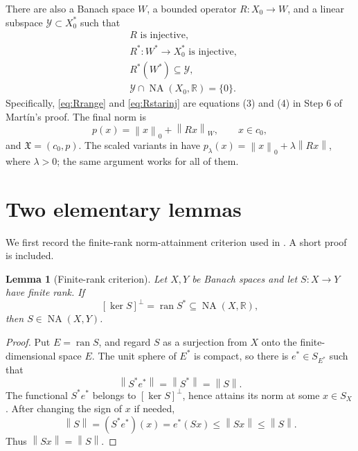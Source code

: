 \documentclass[11pt]{article}
\newtheorem{lemma}[theorem]{Lemma}
\theoremstyle{definition}
\newcommand{\NA}{\operatorname{NA}}
\newcommand{\ran}{\operatorname{ran}}
\newcommand{\R}{\mathbb R}
\newcommand{\X}{\mathfrak X}
\newcommand{\Xzero}{X_0}
\newcommand{\Yop}{\mathscr Y}
\newcommand{\norm}[1]{\left\lVert #1\right\rVert}
\begin{document}
There are also a Banach space \(W\), a bounded operator
\(R:\Xzero\to W\), and a linear subspace \(\Yop\subset \Xzero^*\) such that
\begin{align}
       &R \text{ is injective},                                      \label{eq:Rinj}\\
       &R^*:W^*\longrightarrow \Xzero^* \text{ is injective},         \label{eq:Rstarinj}\\
       &R^*(W^*)\subseteq \Yop,                                      \label{eq:Rrange}\\
       &\Yop\cap\NA(\Xzero,\R)=\{0\}.                               \label{eq:separation}
\end{align}
Specifically, \eqref{eq:Rrange} and \eqref{eq:Rstarinj} are equations (3)
and (4) in Step 6 of Mart\'in's proof.  The final norm is
\begin{equation}\label{eq:final-norm}
              p(x)=\norm{x}_0+\norm{Rx}_W,
              \qquad x\in c_0,
\end{equation}
and \(\X=(c_0,p)\).  The scaled variants in
\cite[Remark 2]{Martin2025} have
\(p_\lambda(x)=\norm{x}_0+\lambda\norm{Rx}\), where \(\lambda>0\); the same
argument works for all of them.

\section{Two elementary lemmas}

We first record the finite-rank norm-attainment criterion used in
\cite[Corollary 2.6]{KLMW}.  A short proof is included.

\begin{lemma}[Finite-rank criterion]\label{lem:finite-rank-criterion}
Let \(X,Y\) be Banach spaces and let \(S:X\to Y\) have finite rank.  If
\[
             [\ker S]^\perp=\ran S^*\subseteq \NA(X,\R),
\]
then \(S\in\NA(X,Y)\).
\end{lemma}

\begin{proof}
Put \(E=\ran S\), and regard \(S\) as a surjection from \(X\) onto the
finite-dimensional space \(E\).  The unit sphere of \(E^*\) is compact, so
there is \(e^*\in S_{E^*}\) such that
\[
             \norm{S^*e^*}=\norm{S^*}=\norm{S}.
\]
The functional \(S^*e^*\) belongs to \([\ker S]^\perp\), hence attains its
norm at some \(x\in S_X\).  After changing the sign of \(x\) if needed,
\[
  \norm{S}
  =(S^*e^*)(x)
  =e^*(Sx)
  \leq \norm{Sx}
  \leq \norm{S}.
\]
Thus \(\norm{Sx}=\norm{S}\).
\end{proof}
\end{document}
